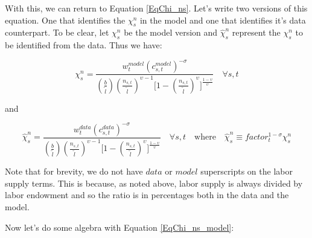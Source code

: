 \documentclass[letterpaper,12pt]{article}
\theoremstyle{definition}
\begin{document}
    With this, we can return to Equation \ref{EqChi_ns}.  Let's write two versions of this equation.  One that identifies the $\chi^{n}_{s}$ in the model and one that identifies it's data counterpart.  To be clear, let $\chi^{n}_{s}$ be the model version and $\hat{\chi}^{n}_{s}$ represent the $\chi^{n}_{s}$ to be identified from the data.  Thus we have:

    \begin{equation}\label{EqChi_ns_model}
      \chi^n_s = \frac{w^{model}_t\left(c^{model}_{s,t}\right)^{-\sigma}}{\left(\frac{b}{\tilde{l}}\right)\left(\frac{n_{s,t}}{\tilde{l}}\right)^{\upsilon-1}\Biggl[1 - \left(\frac{n_{s,t}}{\tilde{l}}\right)^\upsilon\Biggr]^{\frac{1-\upsilon}{\upsilon}}} \quad\forall s, t
    \end{equation}

    and

    \begin{equation}\label{EqChi_ns_data}
      \hat{\chi}^n_s = \frac{w^{data}_t\left(c^{data}_{s,t}\right)^{-\sigma}}{\left(\frac{b}{\tilde{l}}\right)\left(\frac{n_{s,t}}{\tilde{l}}\right)^{\upsilon-1}\Biggl[1 - \left(\frac{n_{s,t}}{\tilde{l}}\right)^\upsilon\Biggr]^{\frac{1-\upsilon}{\upsilon}}} \quad\forall s, t \quad\text{where}\quad \hat{\chi}^n_s\equiv factor_t^{1-\sigma}\chi^n_s
    \end{equation}

    Note that for brevity, we do not have $data$ or $model$ superscripts on the labor supply terms.  This is because, as noted above, labor supply is always divided by labor endowment and so the ratio is in percentages both in the data and the model.

    Now let's do some algebra with Equation \ref{EqChi_ns_model}:
\end{document}
